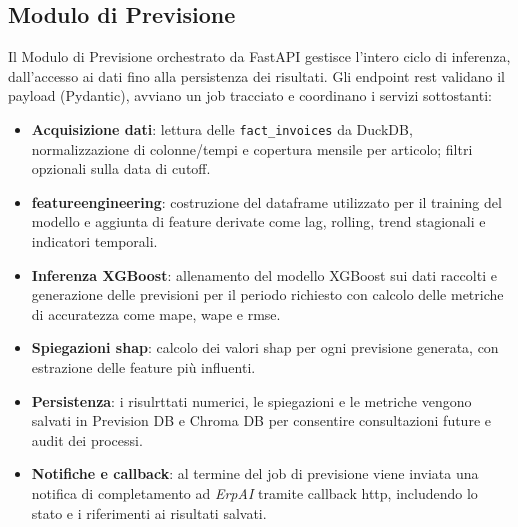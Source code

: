 \subsection{Modulo di Previsione}
Il Modulo di Previsione orchestrato da FastAPI gestisce l’intero ciclo di inferenza, dall’accesso ai dati fino alla persistenza dei risultati. Gli endpoint \acrshort{rest} validano il payload (Pydantic), avviano un job tracciato e coordinano i servizi sottostanti:
\begin{itemize}
    \item \textbf{Acquisizione dati}: lettura delle \texttt{fact\_invoices} da DuckDB, normalizzazione di colonne/tempi e copertura mensile per articolo; filtri opzionali sulla data di cutoff.
    \item \textbf{\gls{featureengineering}}: costruzione del dataframe utilizzato per il training del modello e aggiunta di feature derivate come lag, rolling, trend stagionali e indicatori temporali.
    \item \textbf{Inferenza XGBoost}: allenamento del modello XGBoost sui dati raccolti e generazione delle previsioni per il periodo richiesto con calcolo delle metriche di accuratezza come \gls{mape}, \gls{wape} e \gls{rmse}.
    \item \textbf{Spiegazioni \acrshort{shap}}: calcolo dei valori \acrshort{shap} per ogni previsione generata, con estrazione delle feature più influenti.
    \item \textbf{Persistenza}: i risulrttati numerici, le spiegazioni e le metriche vengono salvati in Prevision DB e Chroma DB per consentire consultazioni future e audit dei processi.
    \item \textbf{Notifiche e callback}: al termine del job di previsione viene inviata una notifica di completamento ad \textit{ErpAI} tramite \gls{callback} \gls{http}, includendo lo stato e i riferimenti ai risultati salvati.
\end{itemize}

